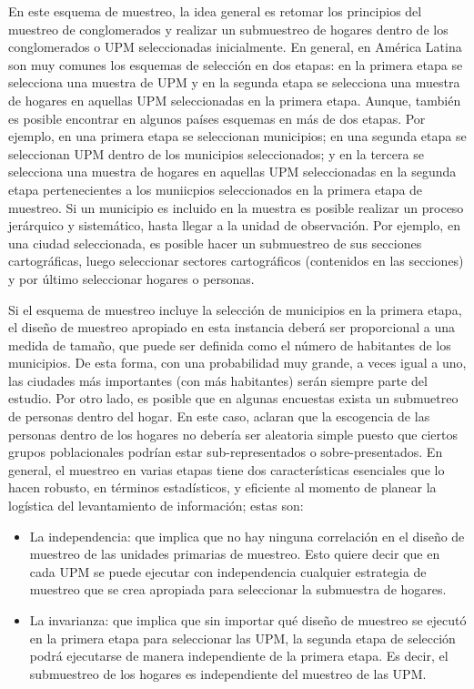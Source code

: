 \documentclass[
  12pt,
]{book}
\providecommand{\tightlist}{%
  \setlength{\itemsep}{0pt}\setlength{\parskip}{0pt}}
\begin{document}
En este esquema de muestreo, la idea general es retomar los principios del muestreo de conglomerados y realizar un submuestreo de hogares dentro de los conglomerados o UPM seleccionadas inicialmente. En general, en América Latina son muy comunes los esquemas de selección en dos etapas: en la primera etapa se selecciona una muestra de UPM y en la segunda etapa se selecciona una muestra de hogares en aquellas UPM seleccionadas en la primera etapa. Aunque, también es posible encontrar en algunos países esquemas en más de dos etapas. Por ejemplo, en una primera etapa se seleccionan municipios; en una segunda etapa se seleccionan UPM dentro de los municipios seleccionados; y en la tercera se selecciona una muestra de hogares en aquellas UPM seleccionadas en la segunda etapa pertenecientes a los muniicpios seleccionados en la primera etapa de muestreo. Si un municipio es incluido en la muestra es posible realizar un proceso jerárquico y sistemático, hasta llegar a la unidad de observación. Por ejemplo, en una ciudad seleccionada, es posible hacer un submuestreo de sus secciones cartográficas, luego seleccionar sectores cartográficos (contenidos en las secciones) y por último seleccionar hogares o personas.

Si el esquema de muestreo incluye la selección de municipios en la primera etapa, el diseño de muestreo apropiado en esta instancia deberá ser proporcional a una medida de tamaño, que puede ser definida como el número de habitantes de los municipios. De esta forma, con una probabilidad muy grande, a veces igual a uno, las ciudades más importantes (con más habitantes) serán siempre parte del estudio. Por otro lado, es posible que en algunas encuestas exista un submuetreo de personas dentro del hogar. En este caso, \citet{Clark_Steel_2007} aclaran que la escogencia de las personas dentro de los hogares no debería ser aleatoria simple puesto que ciertos grupos poblacionales podrían estar sub-representados o sobre-presentados. En general, el muestreo en varias etapas tiene dos características esenciales que lo hacen robusto, en términos estadísticos, y eficiente al momento de planear la logística del levantamiento de información; estas son:

\begin{itemize}
\tightlist
\item
  La independencia: que implica que no hay ninguna correlación en el diseño de muestreo de las unidades primarias de muestreo. Esto quiere decir que en cada UPM se puede ejecutar con independencia cualquier estrategia de muestreo que se crea apropiada para seleccionar la submuestra de hogares.
\item
  La invarianza: que implica que sin importar qué diseño de muestreo se ejecutó en la primera etapa para seleccionar las UPM, la segunda etapa de selección podrá ejecutarse de manera independiente de la primera etapa. Es decir, el submuestreo de los hogares es independiente del muestreo de las UPM.
\end{itemize}
\end{document}
